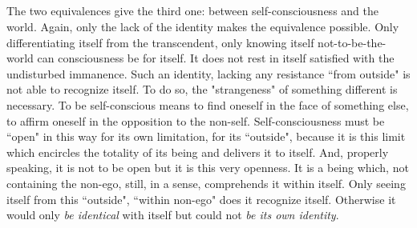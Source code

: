 \subsection{}\label{sg:iii}
The two equivalences give the third one: between self-consciousness and the world. Again, only the lack of 
the identity makes the equivalence possible. Only differentiating itself from the transcendent, only knowing itself 
not-to-be-the-world can consciousness be for itself. It does not rest in itself satisfied with the undisturbed 
immanence. Such an identity, lacking any resistance ``from outside" is not able to recognize itself. To do so, the 
"strangeness" of something different is necessary. To be self-conscious means to find oneself in the face of 
something else, to affirm oneself in the opposition to the non-self. Self-consciousness must be ``open" in this way 
for its own limitation, for its ``outside", because it is this limit which encircles the totality of its being and 
delivers it to itself. And, properly speaking, it is not to be open but it is this very openness. It is a being which, 
not containing the non-ego, still, in a sense, comprehends it within itself. Only seeing itself from this ``outside", 
``within non-ego" does it recognize itself. 
Otherwise it would only {\em be identical} with itself but could not {\em be its own 
identity}.

